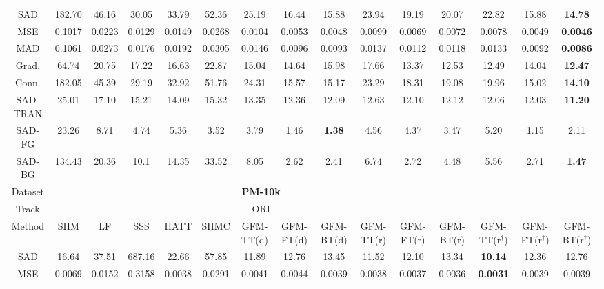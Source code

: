 \documentclass[twocolumn]{svjour3}
\begin{document}
\begin{table*}[htbp]
{\begin{tabular}{c|ccccc|ccc|ccc|ccc}
\hline
SAD & 182.70&46.16&30.05&\multicolumn{1}{c|}{33.79} &\multicolumn{1}{c}{52.36} &\multicolumn{1}{c}{25.19}&16.44&\multicolumn{1}{c|}{15.88}&23.94&19.19 &\multicolumn{1}{c}{20.07}&22.82 &15.88&\textbf{14.78}\\
MSE &0.1017&0.0223&0.0129&\multicolumn{1}{c|}{0.0149}&\multicolumn{1}{c}{0.0268} &\multicolumn{1}{c}{0.0104}&0.0053&\multicolumn{1}{c|}{0.0048}&0.0099&\multicolumn{1}{c}{0.0069} &\multicolumn{1}{c}{0.0072}&0.0078 &0.0049&\textbf{0.0046}\\
MAD &0.1061&0.0273&0.0176&\multicolumn{1}{c|}{0.0192}&\multicolumn{1}{c}{0.0305} &\multicolumn{1}{c}{0.0146}&0.0096&\multicolumn{1}{c|}{0.0093}&0.0137&\multicolumn{1}{c}{0.0112}&\multicolumn{1}{c}{0.0118}&0.0133 &0.0092&\textbf{0.0086}\\
Grad. &64.74&20.75&17.22&\multicolumn{1}{c|}{16.63}&\multicolumn{1}{c}{22.87} &15.04&14.64&\multicolumn{1}{c|}{15.98}&17.66&\multicolumn{1}{c}{13.37} &\multicolumn{1}{c}{12.53}&12.49&14.04& \textbf{12.47}\\
Conn. &182.05&45.39&29.19&\multicolumn{1}{c|}{32.92}&\multicolumn{1}{c}{51.76} &24.31&15.57&\multicolumn{1}{c|}{15.17}&23.29&\multicolumn{1}{c}{18.31} &\multicolumn{1}{c}{19.08}&19.96&15.02&\textbf{14.10}\\
SAD-TRAN &25.01&17.10&15.21&\multicolumn{1}{c|}{14.09}&\multicolumn{1}{c}{15.32} &13.35&12.36&\multicolumn{1}{c|}{12.09}&12.63&\multicolumn{1}{c}{12.10} &\multicolumn{1}{c}{12.12}&12.06 &12.03&\textbf{11.20}\\
SAD-FG &23.26&8.71&4.74&\multicolumn{1}{c|}{5.36}&\multicolumn{1}{c}{3.52} &3.79&1.46&\multicolumn{1}{c|}{\textbf{1.38}}&4.56&\multicolumn{1}{c}{4.37} &\multicolumn{1}{c}{3.47}&5.20 &1.15& 2.11\\
SAD-BG &134.43&20.36&10.1&\multicolumn{1}{c|}{14.35}&\multicolumn{1}{c}{33.52} &8.05&2.62&\multicolumn{1}{c|}{2.41}&6.74&\multicolumn{1}{c}{2.72} &\multicolumn{1}{c}{4.48}&5.56 &2.71 & \textbf{1.47}\\
\hline 
Dataset & \multicolumn{11}{|c}{\textbf{PM-10k}} \\
\hline
Track & \multicolumn{11}{|c}{ORI} \\
\hline
Method & SHM & LF & SSS &HATT &SHMC& GFM-TT(d) & GFM-FT(d) & GFM-BT(d)  & GFM-TT(r) & GFM-FT(r) & GFM-BT(r) &GFM-TT(r$^\dag$) &GFM-FT(r$^\dag$) & GFM-BT(r$^\dag$) \\
\hline
SAD & 16.64 & 37.51 & 687.16& 22.66 &57.85  &11.89&12.76&13.45 &11.52&12.10& 13.34&\textbf{10.14}&12.36&12.76\\
MSE & 0.0069 & 0.0152& 0.3158 & 0.0038 & 0.0291 &0.0041&0.0044&0.0039&0.0038&0.0037& 0.0036&\textbf{0.0031}&0.0039 & 0.0039\\

\end{tabular}}
\end{table*}
\end{document}
